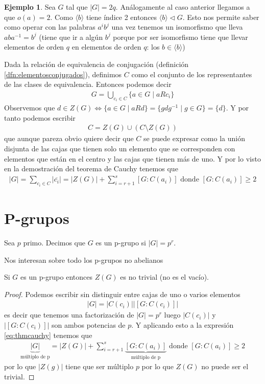 \documentclass{book}
\theoremstyle{definition}
\newtheorem{ej}{Ejemplo}
\theoremstyle{remark}
\newcommand{\normsub}{\mathbin{\triangleleft}}
\newcommand{\inv}[1]{#1^{-1}}
\begin{document}
\begin{ej}
	Sea $G$ tal que $|G| = 2q$. Análogamente al caso anterior llegamos a que $o(a) = 2$. Como $\langle b \rangle$ tiene índice 2 entonces $\langle b \rangle \normsub G$. Esto nos permite saber como operar con las palabras $a^ib^j$ una vez tenemos un isomorfismo que lleva $a b \inv{a} = b^j$ (tiene que ir a algún $b^j$ porque por ser isomorfismo tiene que llevar elementos de orden $q$ en elementos de orden $q$: los $b \in \langle b \rangle$)
\end{ej}

Dada la relación de equivalencia de conjugación (definición \ref{dfn:elementosconjugados}), definimos $C$ como el conjunto de los representantes de las clases de equivalencia. Entonces podemos decir
\begin{align*}
G = \bigcup_{c_i \in C} \{a \in G \mid a R c_i\}
\end{align*}
Observemos que $d \in Z(G) \iff \{a \in G \mid a R d\} = \{gd\inv{g} \mid g \in G\} = \{d\}$. Y por tanto podemos escribir
\begin{align*}
C = Z(G) \cup (C\setminus Z(G))
\end{align*}
que aunque pareza obvio quiere decir que $C$ se puede expresar como la unión disjunta de las cajas que tienen solo un elemento que se corresponden con elementos que están en el centro y las cajas que tienen más de uno. Y por lo visto en la demostración del teorema de Cauchy tenemos que
\begin{align*}
	|G| = \sum_{c_i \in C} | \overline{c_i} | = |Z(G)| + \sum_{i = r + 1}^{s} [G : C(a_i)] \text{ donde } [G : C(a_i)] \geq 2
\end{align*}

\section{P-grupos}

\begin{dfn}[P-grupo]
	Sea $p$ primo. Decimos que $G$ es un p-grupo si $|G| = p^r$.
\end{dfn}

Nos interesan sobre todo los p-grupos no abelianos

\begin{thm}
	Si $G$ es un p-grupo entonces $Z(G)$ es no trivial (no es el vacío).
\end{thm}

\begin{proof}
	Podemos escribir sin distinguir entre cajas de uno o varios elementos
	\begin{align*}
		|G| = |C(c_i)||[G:C(c_i)]|
	\end{align*}
	es decir que tenemos una factorización de $|G| = p^r$ luego $|C(c_i)|$ y $|[G:C(c_i)]|$ son ambos potencias de $p$. Y aplicando esto a la expresión \ref{eq:thmcauchy} tenemos que
	\begin{align*}
		\underbrace{|G|}_{\text{múltiplo de p}} = |Z(G)| + \sum_{i = r + 1}^{s} \underbrace{[G : C(a_i)]}_{\text{múltiplo de p}} \text{ donde } [G : C(a_i)] \geq 2
	\end{align*}
	por lo que $|Z(g)|$ tiene que ser múltiplo $p$ por lo que $Z(G)$ no puede ser el trivial.
\end{proof}
\end{document}

